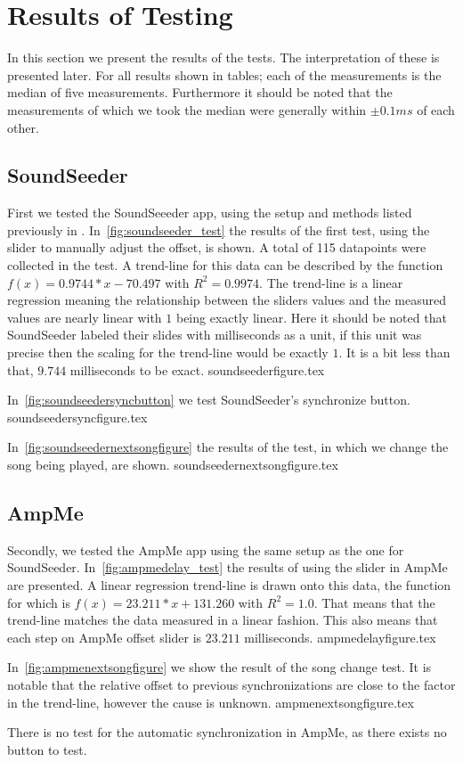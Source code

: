 \section{Results of Testing}
In this section we present the results of the tests.
The interpretation of these is presented later.
For all results shown in tables; each of the measurements is the median of five measurements.
Furthermore it should be noted that the measurements of which we took the median were generally within $\pm 0.1 ms$ of each other.

\subsection{SoundSeeder}
First we tested the SoundSeeeder app, using the setup and methods listed previously in .
In~\vref{fig:soundseeder_test} the results of the first test, using the slider to manually adjust the offset, is shown.
A total of 115 datapoints were collected in the test.
A trend-line for this data can be described by the function $f(x) = 0.9744 * x - 70.497$ with $R^2=0.9974$.
The trend-line is a linear regression meaning the relationship between the sliders values and the measured values are nearly linear with $1$ being exactly linear.
Here it should be noted that SoundSeeder labeled their slides with milliseconds as a unit, if this unit was precise then the scaling for the trend-line would be exactly $1$.
It is a bit less than that, $9.744$ milliseconds to be exact.
{soundseederfigure.tex}

In~\vref{fig:soundseedersyncbutton} we test SoundSeeder's synchronize button.
{soundseedersyncfigure.tex}

In~\vref{fig:soundseedernextsongfigure} the results of the test, in which we change the song being played, are shown.
{soundseedernextsongfigure.tex}

\subsection{AmpMe}
Secondly, we tested the AmpMe app using the same setup as the one for SoundSeeder.
In~\vref{fig:ampmedelay_test} the results of using the slider in AmpMe are presented.
A linear regression trend-line is drawn onto this data, the function for which is $f(x) = 23.211 * x + 131.260$ with $R^2 = 1.0$.
That means that the trend-line matches the data measured in a linear fashion.
This also means that each step on AmpMe offset slider is $23.211$ milliseconds.
{ampmedelayfigure.tex}

In~\vref{fig:ampmenextsongfigure} we show the result of the song change test.
It is notable that the relative offset to previous synchronizations are close to the factor in the trend-line, however the cause is unknown.
{ampmenextsongfigure.tex}

There is no test for the automatic synchronization in AmpMe, as there exists no button to test.

